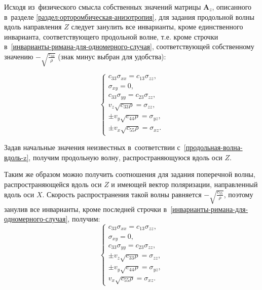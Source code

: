 \documentclass[thesis.tex]{subfiles}
\begin{document}
Исходя из~физического смысла собственных значений матрицы $\bm A_z$, описанного в~разделе \ref{раздел:орторомбическая-анизотропия},
для задания продольной волны вдоль направления $Z$ следует занулить все инварианты, кроме единственного инварианта,
соответствующего продольной волне, т.е. кроме строчки в~\eqref{инварианты-римана-для-одномерного-случая},
соответствующей собственному значению $-\sqrt{\frac{c_{33}}{\rho}}$ (знак минус выбран для удобства):

\begin{equation}
    \label{продольная-волна-вдоль-z}
    \left\{
        \begin{array}{cccccccccccc}
            c_{33}\sigma_{xx} = c_{13}\sigma_{zz}, \\
            \sigma_{xy} = 0, \\
            c_{33}\sigma_{yy} = c_{23}\sigma_{zz}, \\
            v_z\sqrt{c_{33}\rho} = \sigma_{zz}, \\
            \pm v_y\sqrt{c_{44}\rho} = \sigma_{yz}, \\
            \pm v_x\sqrt{c_{55}\rho} = \sigma_{xz}.
        \end{array}
    \right.
\end{equation}

Задав начальные значения неизвестных в~соответствии с~\eqref{продольная-волна-вдоль-z}, получим продольную волну,
распространяющуюся вдоль оси $Z$.

Таким же образом можно получить соотношения для задания поперечной волны, распространяющейся вдоль оси $Z$  и имеющей
вектор поляризации, направленный вдоль оси $X$. Скорость распространения такой волны равняется $-\sqrt{\frac {c_ {55}}{\rho}}$,
поэтому занулив все инварианты, кроме последней строчки в~\eqref{инварианты-римана-для-одномерного-случая}, получим:
\begin{equation}
    \label{поперечная-волна-x-вдоль-z}
    \left\{
        \begin{array}{cccccccccccc}
            c_{33}\sigma_{xx} = c_{13}\sigma_{zz}, \\
            \sigma_{xy} = 0, \\
            c_{33}\sigma_{yy} = c_{23}\sigma_{zz}, \\
            \pm v_z\sqrt{c_{33}\rho} = \sigma_{zz}, \\
            \pm v_y\sqrt{c_{44}\rho} = \sigma_{yz}, \\
            v_x\sqrt{c_{55}\rho} = \sigma_{xz}.
        \end{array}
    \right.
\end{equation}
\end{document}
